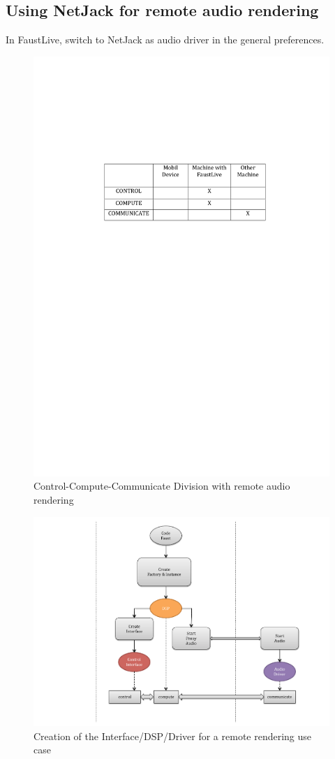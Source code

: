 \documentclass[a4paper]{article}
\begin{document}
\newpage
\subsection {Using NetJack for remote audio rendering} \label{remoterendering}

In FaustLive, switch to NetJack as audio driver in the general preferences. 
\begin{figure}[!h]
\begin{center}
\includegraphics[width=0.7\columnwidth]{images/3CCC}
\caption{Control-Compute-Communicate Division with remote audio rendering}
\label{fig:3CCC}
\end{center}
\end{figure}
\begin{figure}[!h]
\begin{center}
\includegraphics[width=\columnwidth]{images/CCC3}
\caption{Creation of the Interface/DSP/Driver for a remote rendering use case}
\label{fig:CCC2}
\end{center}
\end{figure}
\newpage
\end{document}

